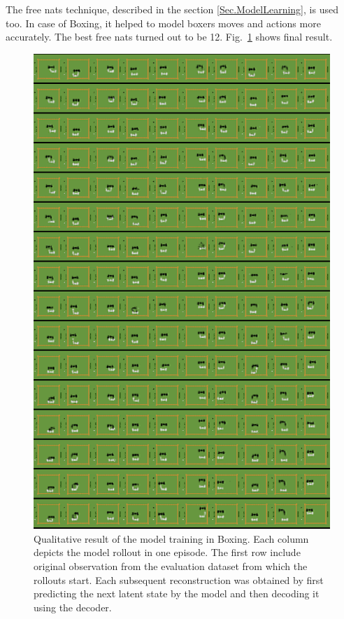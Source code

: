 The free nats technique, described in the section \ref{Sec.ModelLearning}, is used too. In case of Boxing, it helped to model boxers moves and actions more accurately. The best free nats turned out to be 12. Fig.~\ref{Fig.PlaNet_Boxing_lower_divergence_scale} shows final result.

\begin{figure}[H]
\includegraphics[height=0.9\textheight,keepaspectratio]{figures/PlaNet/Boxing_memory_sharp.png}
\caption[Qualitative result of the PlaNet model training with a lower divergence scale in Boxing]{Qualitative result of the model training in Boxing. Each column depicts the model rollout in one episode. The first row include original observation from the evaluation dataset from which the rollouts start. Each subsequent reconstruction was obtained by first predicting the next latent state by the model and then decoding it using the decoder.}
\label{Fig.PlaNet_Boxing_lower_divergence_scale}
\end{figure}

